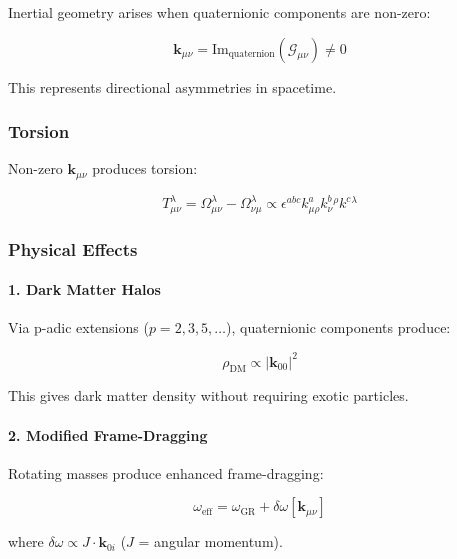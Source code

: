 Inertial geometry arises when quaternionic components are non-zero:

\begin{equation}
\mathbf{k}_{\mu\nu} = \text{Im}_{\text{quaternion}}(\mathcal{G}_{\mu\nu}) \neq 0
\end{equation}

This represents directional asymmetries in spacetime.

\subsubsection{Torsion}

Non-zero $\mathbf{k}_{\mu\nu}$ produces torsion:

\begin{equation}
T^\lambda_{\mu\nu} = \Omega^\lambda_{\mu\nu} - \Omega^\lambda_{\nu\mu} \propto \epsilon^{abc} k^a_{\mu\rho} k^b_{\nu}{}^\rho k^c{}^\lambda
\end{equation}

\subsubsection{Physical Effects}

\paragraph{1. Dark Matter Halos}

Via p-adic extensions ($p = 2, 3, 5, \ldots$), quaternionic components produce:

\begin{equation}
\rho_{\text{DM}} \propto |\mathbf{k}_{00}|^2
\end{equation}

This gives dark matter density without requiring exotic particles.

\paragraph{2. Modified Frame-Dragging}

Rotating masses produce enhanced frame-dragging:

\begin{equation}
\omega_{\text{eff}} = \omega_{\text{GR}} + \delta\omega[\mathbf{k}_{\mu\nu}]
\end{equation}

where $\delta\omega \propto J \cdot \mathbf{k}_{0i}$ ($J$ = angular momentum).

